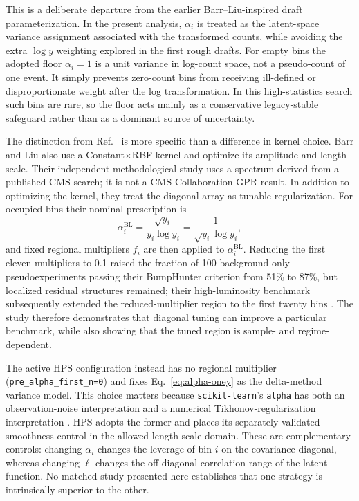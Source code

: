 This is a deliberate departure from the earlier Barr--Liu-inspired draft
parameterization. In the present analysis, $\alpha_i$ is treated as the latent-space
variance assignment associated with the transformed counts, while avoiding the extra
$\log y$ weighting explored in the first rough drafts. For empty bins the adopted floor
$\alpha_i=1$ is a unit variance in log-count space, not a pseudo-count of one event. It
simply prevents zero-count bins from receiving ill-defined or disproportionate weight
after the log transformation. In this high-statistics search such bins are rare, so the
floor acts mainly as a conservative legacy-stable safeguard rather than as a dominant
source of uncertainty.

The distinction from Ref.~\cite{BarrLiu2025} is more specific than a difference in
kernel choice. Barr and Liu also use a Constant$\times$RBF kernel and optimize its
amplitude and length scale. Their independent methodological study uses a spectrum
derived from a published CMS search; it is not a CMS Collaboration GPR result. In
addition to optimizing the kernel, they treat the diagonal array as tunable
regularization. For occupied bins their nominal prescription is
\begin{equation}
\alpha_i^{\mathrm{BL}}
= \frac{\sqrt{y_i}}{y_i\log y_i}
= \frac{1}{\sqrt{y_i}\log y_i},
\end{equation}
and fixed regional multipliers $f_i$ are then applied to
$\alpha_i^{\mathrm{BL}}$. Reducing the first eleven multipliers to 0.1 raised the
fraction of 100 background-only pseudoexperiments passing their BumpHunter criterion
from 51\% to 87\%, but localized residual structures remained; their high-luminosity
benchmark subsequently extended the reduced-multiplier region to the first twenty
bins \cite{BarrLiu2025}. The study therefore demonstrates that diagonal tuning can
improve a particular benchmark, while also showing that the tuned region is
sample- and regime-dependent.

The active HPS configuration instead has no regional multiplier
(\texttt{pre\_alpha\_first\_n=0}) and fixes Eq.~\eqref{eq:alpha-oney} as the
delta-method variance model. This choice matters because \texttt{scikit-learn}'s
\texttt{alpha} has both an observation-noise interpretation and a numerical
Tikhonov-regularization interpretation \cite{ScikitLearnGPRDocs16}. HPS adopts the
former and places its separately validated smoothness control in the allowed
length-scale domain. These are complementary controls: changing $\alpha_i$ changes
the leverage of bin $i$ on the covariance diagonal, whereas changing $\ell$ changes
the off-diagonal correlation range of the latent function. No matched study presented
here establishes that one strategy is intrinsically superior to the other.

